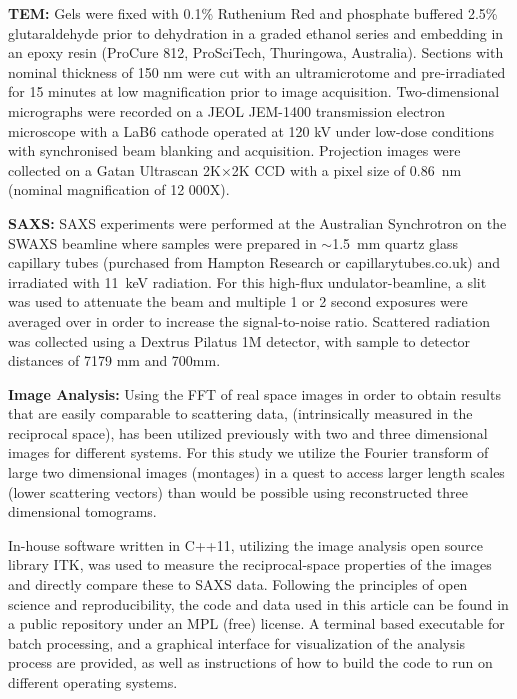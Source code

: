 \textbf{TEM: }Gels were fixed with 0.1\% Ruthenium Red and phosphate buffered 2.5\% glutaraldehyde prior to dehydration in a graded ethanol series and embedding in an epoxy resin (ProCure 812, ProSciTech, Thuringowa, Australia). Sections with nominal thickness of 150 nm were cut with an ultramicrotome and pre-irradiated for 15 minutes at low magnification prior to image acquisition. Two-dimensional micrographs were recorded on a JEOL JEM-1400 transmission electron microscope with a LaB6 cathode operated at 120 kV under low-dose conditions with synchronised beam blanking and acquisition. Projection images were collected on a Gatan Ultrascan 2K$\times$2K CCD with a pixel size of \SI{0.86}{\nm} (nominal magnification of 12 000X).

\textbf{SAXS: } SAXS experiments were performed at the Australian Synchrotron on the SWAXS beamline where samples were prepared in $\sim$\SI{1.5}{\mm} quartz glass capillary tubes (purchased from Hampton Research or capillarytubes.co.uk) and irradiated with \SI{11}{\keV} radiation. For this high-flux undulator-beamline, a slit was used to attenuate the beam and multiple 1 or 2 second exposures were averaged over in order to increase the signal-to-noise ratio. Scattered radiation was collected using a Dextrus Pilatus 1M detector, with sample to detector distances of 7179 mm and 700mm.

\textbf{Image Analysis:}
Using the FFT of real space images in order to obtain results that are easily comparable to scattering data, (intrinsically measured in the reciprocal space), has been utilized previously with two \cite{tanaka_application_1986} and three dimensional images \cite{takahashi_real_2003} for different systems. For this study we utilize the Fourier transform of large two dimensional images (montages) in a quest to access larger length scales (lower scattering vectors) than would be possible using reconstructed three dimensional tomograms.


In-house software \cite{cerdan_fftradialintenstiy_2017} written in C++11, utilizing the image analysis open source library ITK, \cite{johnson_itk_2013} was used to measure the reciprocal-space properties of the images and directly compare these to SAXS data. Following the principles of open science and reproducibility, the code and data used in this article can be found in a public repository \cite{cerdan_fftradialintenstiy_2017} under an MPL (free) license. A terminal based executable for batch processing, and a graphical interface for visualization of the analysis process are provided, as well as instructions of how to build the code to run on different operating systems.

